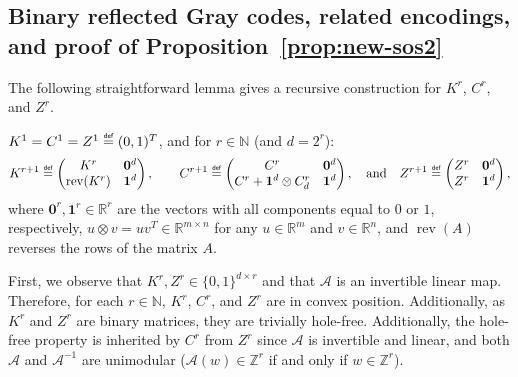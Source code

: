\documentclass[opre,nonblindrev]{informs3} %
\newcommand{\scrA}{\mathscr{A}}
\newcommand{\bbN}{\mathbb{N}}
\newcommand{\bbR}{\mathbb{R}}
\newcommand{\bbZ}{\mathbb{Z}}
\newcommand{\calC}{\mathcal{C}}
\newcommand{\Conv}{\operatorname{Conv}}
\newcommand{\ext}{\operatorname{ext}}
\newcommand\defeq{\mathrel{\overset{\makebox[0pt]{\mbox{\normalfont\tiny\sffamily def}}}{=}}}
\begin{document}
\newpage
\renewcommand{\theHsection}{A\arabic{section}}
\begin{APPENDICES}


\section{Binary reflected Gray codes, related encodings, and proof of Proposition~\ref{prop:new-sos2}} \label{app:encodings}
     \newcommand{\rev}{\operatorname{rev}}
    \newcommand{\rep}{\operatorname{rep}}
The following straightforward lemma gives a recursive construction for $K^r$, $C^r$, and $Z^r$.
    \begin{lemma} \label{lem:encodings}
    $K^1=C^1=Z^1\defeq (0,1)^T$, and for $r \in \bbN$ (and $d=2^r$):
    \[
        \setlength\arraycolsep{5pt}K^{r+1}\defeq \begin{pmatrix} K^r & \mathbf{0}^{d} \\ \rev(K^r) & \mathbf{1}^{d} \end{pmatrix},\quad\quad C^{r+1}\defeq \begin{pmatrix}C^r & \mathbf{0}^{d} \\C^r + \mathbf{1}^{d}\otimes C^r_{d} & \mathbf{1}^{d} \end{pmatrix},\quad\text{and}\quad Z^{r+1}\defeq \begin{pmatrix}Z^r & \mathbf{0}^{d} \\Z^r  & \mathbf{1}^{d} \end{pmatrix},
    \]
    where $\mathbf{0}^{r}, \mathbf{1}^{r} \in \bbR^r$ are the vectors with all components equal to $0$ or $1$, respectively, $u\otimes v=uv^T\in\mathbb{R}^{m\times n}$ for any $u\in \mathbb{R}^m$ and $v\in \mathbb{R}^n$, and $\rev(A)$ reverses the rows of the matrix $A$.
    \end{lemma}
        First, we observe that $K^r, Z^r \in \{0,1\}^{d \times r}$ and that $\scrA$ is an invertible linear map. Therefore, for each $r \in \bbN$, $K^r$, $C^r$, and $Z^r$ are in convex position. Additionally, as $K^r$ and $Z^r$ are binary matrices, they are trivially hole-free. Additionally, the hole-free property is inherited by $C^r$ from $Z^r$ since $\scrA$ is invertible and linear, and both  $\scrA$ and  $\scrA^{-1}$ are unimodular ($\scrA(w) \in \bbZ^r$ if and only if $w \in \bbZ^r$).        %

\end{APPENDICES}
\end{document}
